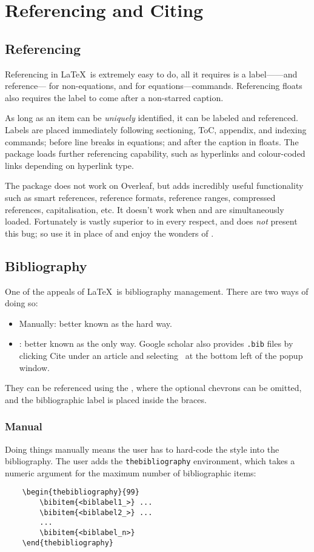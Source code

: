 \chapter{Referencing and Citing}
\section{Referencing}
%
Referencing in \LaTeX~is extremely easy to do, all it requires is a
label------and reference--- for
non-equations, and  for equations---commands.
Referencing floats also requires the label to come after a non-starred
caption.

As long as an item can be \emph{uniquely} identified, it can be
labeled and referenced.  Labels are placed immediately following
sectioning, ToC, appendix, and indexing commands; before line breaks
in equations; and after the caption in floats.  The 
package loads further referencing capability, such as hyperlinks and
colour-coded links depending on hyperlink type.

The package  does not work on Overleaf, but adds
incredibly useful functionality such as smart references, reference
formats, reference ranges, compressed references, capitalisation, etc.
It doesn't work when  and  are
simultaneously loaded.  Fortunately  is vastly superior
to  in every respect, and does \emph{not} present this
bug; so use it in place of  and enjoy the wonders of
.
%
\section{Bibliography}
%
One of the appeals of \LaTeX~is bibliography management.  There are
two ways of doing so:
\begin{itemize}
    \item Manually: better known as the hard way.
    \item \BibTeX: better known as the only way.  Google scholar also
      provides \texttt{.bib} files by clicking Cite under an article
      and selecting \BibTeX~at the bottom left of the popup window.
\end{itemize}
They can be referenced using the , where the optional
chevrons can be omitted, and the bibliographic label is placed inside
the braces.
%
\subsection{Manual}
%
Doing things manually means the user has to hard-code the style into
the bibliography.  The user adds the \verb|thebibliography|
environment, which takes a numeric argument for the maximum number of
bibliographic items:
\begin{verbatim}
	\begin{thebibliography}{99}
	    \bibitem{<biblabel1_>} ...
	    \bibitem{<biblabel2_>} ...
	    ...
	    \bibitem{<biblabel_n>}
	\end{thebibliography}
\end{verbatim}
%
